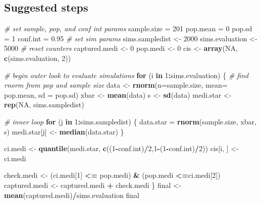 \documentclass[]{article}
\newenvironment{Shaded}{\begin{snugshade}}{\end{snugshade}}
\newcommand{\CommentTok}[1]{\textcolor[rgb]{0.56,0.35,0.01}{\textit{#1}}}
\newcommand{\ControlFlowTok}[1]{\textcolor[rgb]{0.13,0.29,0.53}{\textbf{#1}}}
\newcommand{\DataTypeTok}[1]{\textcolor[rgb]{0.13,0.29,0.53}{#1}}
\newcommand{\DecValTok}[1]{\textcolor[rgb]{0.00,0.00,0.81}{#1}}
\newcommand{\FloatTok}[1]{\textcolor[rgb]{0.00,0.00,0.81}{#1}}
\newcommand{\KeywordTok}[1]{\textcolor[rgb]{0.13,0.29,0.53}{\textbf{#1}}}
\newcommand{\NormalTok}[1]{#1}
\newcommand{\OperatorTok}[1]{\textcolor[rgb]{0.81,0.36,0.00}{\textbf{#1}}}
\newcommand{\OtherTok}[1]{\textcolor[rgb]{0.56,0.35,0.01}{#1}}
\newcommand{\StringTok}[1]{\textcolor[rgb]{0.31,0.60,0.02}{#1}}
\begin{document}
\hypertarget{suggested-steps}{%
\subsection{Suggested steps}\label{suggested-steps}}

\begin{Shaded}
\begin{Highlighting}[]
\CommentTok{# set sample, pop, and conf int params}
\NormalTok{sample.size =}\StringTok{ }\DecValTok{201}
\NormalTok{pop.mean =}\StringTok{ }\DecValTok{0}
\NormalTok{pop.sd =}\StringTok{ }\DecValTok{1}
\NormalTok{conf.int =}\StringTok{ }\FloatTok{0.95}
\CommentTok{# set sim params}
\NormalTok{sims.sampledist <-}\StringTok{ }\DecValTok{2000}
\NormalTok{sims.evaluation <-}\StringTok{ }\DecValTok{5000}
\CommentTok{# reset counters}
\NormalTok{captured.medi <-}\StringTok{ }\DecValTok{0} 
\NormalTok{pop.medi <-}\StringTok{ }\DecValTok{0}
\NormalTok{cis <-}\StringTok{ }\KeywordTok{array}\NormalTok{(}\OtherTok{NA}\NormalTok{, }\KeywordTok{c}\NormalTok{(sims.evaluation, }\DecValTok{2}\NormalTok{))}
  
\CommentTok{# begin outer look to evaluate simulations}
\ControlFlowTok{for}\NormalTok{ (i }\ControlFlowTok{in} \DecValTok{1}\OperatorTok{:}\NormalTok{sims.evaluation) \{}
  \CommentTok{# find rnorm from pop and sample size}
\NormalTok{  data <-}\StringTok{ }\KeywordTok{rnorm}\NormalTok{(}\DataTypeTok{n=}\NormalTok{sample.size, }\DataTypeTok{mean=}\NormalTok{ pop.mean, }\DataTypeTok{sd =}\NormalTok{ pop.sd)}
\NormalTok{  xbar <-}\StringTok{ }\KeywordTok{mean}\NormalTok{(data)}
\NormalTok{  s <-}\StringTok{ }\KeywordTok{sd}\NormalTok{(data)}
\NormalTok{  medi.star <-}\StringTok{ }\KeywordTok{rep}\NormalTok{(}\OtherTok{NA}\NormalTok{, sims.sampledist)}
  
  \CommentTok{# inner loop}
  \ControlFlowTok{for}\NormalTok{ (j }\ControlFlowTok{in} \DecValTok{1}\OperatorTok{:}\NormalTok{sims.sampledist) \{}
\NormalTok{    data.star =}\StringTok{ }\KeywordTok{rnorm}\NormalTok{(sample.size, xbar, s)}
\NormalTok{    medi.star[j] <-}\StringTok{ }\KeywordTok{median}\NormalTok{(data.star)}
\NormalTok{  \}}
  
\NormalTok{  ci.medi <-}\StringTok{ }\KeywordTok{quantile}\NormalTok{(medi.star, }\KeywordTok{c}\NormalTok{((}\DecValTok{1}\OperatorTok{-}\NormalTok{conf.int)}\OperatorTok{/}\DecValTok{2}\NormalTok{,}\DecValTok{1}\OperatorTok{-}\NormalTok{(}\DecValTok{1}\OperatorTok{-}\NormalTok{conf.int)}\OperatorTok{/}\DecValTok{2}\NormalTok{))}
\NormalTok{  cis[i, ] <-}\StringTok{ }\NormalTok{ci.medi}
  
\NormalTok{  check.medi <-}\StringTok{ }\NormalTok{(ci.medi[}\DecValTok{1}\NormalTok{] }\OperatorTok{<=}\StringTok{ }\NormalTok{pop.medi) }\OperatorTok{&}\StringTok{ }\NormalTok{(pop.medi }\OperatorTok{<=}\NormalTok{ci.medi[}\DecValTok{2}\NormalTok{])}
\NormalTok{  captured.medi <-}\StringTok{ }\NormalTok{captured.medi }\OperatorTok{+}\StringTok{ }\NormalTok{check.medi}
\NormalTok{\}}
\NormalTok{final <-}\StringTok{ }\KeywordTok{mean}\NormalTok{(captured.medi)}\OperatorTok{/}\NormalTok{sims.evaluation}
\NormalTok{final}
\end{Highlighting}
\end{Shaded}
\end{document}
